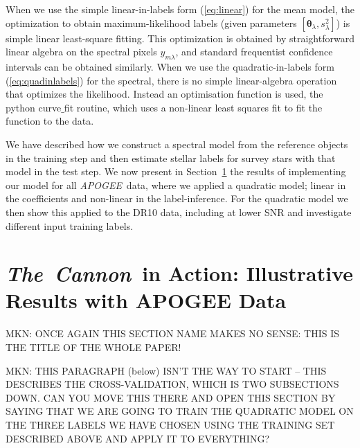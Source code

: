 \documentclass[12pt, preprint]{aastex}
\newcommand{\sectionname}{Section}
\newcommand{\tc}{\textsl{The~Cannon}}
\newcommand{\apogee}{\textsl{APOGEE}}
\newcommand{\set}[1]{\bm{#1}}
\begin{document}
When we use the simple linear-in-labels form (\ref{eq:linear}) for the
mean model, the optimization to obtain maximum-likelihood labels
(given parameters $[\set{\theta}_\lambda, s_\lambda^2]$) is simple linear
least-square fitting.
This optimization is obtained by straightforward linear algebra on the
spectral pixels $y_{m\lambda}$, and standard frequentist confidence
intervals can be obtained similarly.
When we use the quadratic-in-labels form (\ref{eq:quadinlabels}) for the
spectral, there is no simple linear-algebra operation that
optimizes the likelihood. 
Instead an optimisation function is used, the python curve$\_$fit routine, which uses a non-linear least squares fit to fit the function to the data. 

We have described how we construct a spectral model from the reference objects in the training step and then 
estimate stellar labels for survey stars with that model in the test step. 
We now present in \sectionname~\ref{sec:results} the results of implementing our model for all \apogee\ data, where we applied a quadratic model; linear in the coefficients and non-linear in the label-inference.  
For the quadratic model we then show this applied to the DR10 data, including at lower SNR and investigate different input training labels. 

\section{\tc\ in Action: Illustrative Results with APOGEE Data}
\label{sec:results}

MKN: ONCE AGAIN THIS SECTION NAME MAKES NO SENSE: THIS IS THE TITLE OF THE WHOLE PAPER!


MKN: THIS PARAGRAPH (below) ISN'T THE WAY TO START -- THIS DESCRIBES THE CROSS-VALIDATION, WHICH IS TWO SUBSECTIONS DOWN.  CAN YOU MOVE THIS THERE AND OPEN THIS SECTION BY SAYING THAT WE ARE GOING TO TRAIN THE QUADRATIC MODEL ON THE THREE LABELS WE HAVE CHOSEN USING THE TRAINING SET DESCRIBED ABOVE AND APPLY IT TO EVERYTHING?
\end{document}
